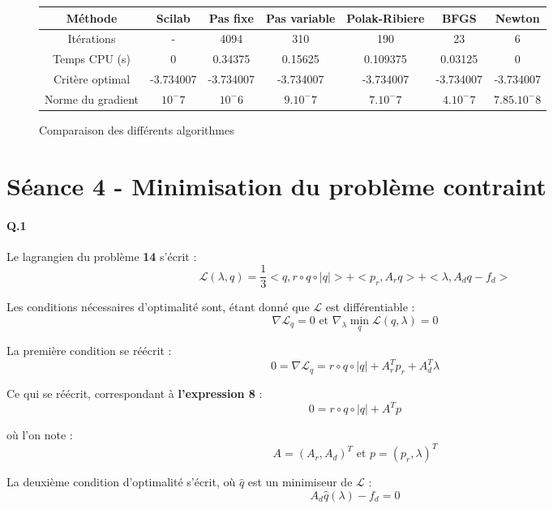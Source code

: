 \documentclass{article}
\begin{document}
    \begin{figure}

        \begin{tabular}{|c|cccccc|}
            \hline
            Méthode & Scilab & Pas fixe & Pas variable & Polak-Ribiere & BFGS & Newton \\
            \hline 
            Itérations & - & 4094 & 310 & 190 & 23 & 6\\
            Temps CPU (s) & 0 & 0.34375 & 0.15625 & 0.109375 & 0.03125 & 0\\
            Critère optimal & -3.734007 & -3.734007 & -3.734007 & -3.734007 & -3.734007 & -3.734007\\
            Norme du gradient & $10^-7$ & $10^-6$ & $9.10^-7$ & $7.10^-7$ & $4.10^-7$ & $7.85.10^-8$\\
            \hline
        \end{tabular}
        \caption{Comparaison des différents algorithmes}
        \label{comparAlgo}
    \end{figure}

    \section{Séance 4 - Minimisation du problème contraint}
        \paragraph{Q.1} Le lagrangien du problème \textbf{14} s'écrit : 
        \[ \mathcal{L}(\lambda, q) = \frac{1}{3}<q, r \circ q \circ |q|> + <p_r, A_rq>
                                    + <\lambda, A_dq - f_d> \]
        
        Les conditions nécessaires d'optimalité sont, étant donné que $\mathcal{L}$ est différentiable :
        \[ \nabla \mathcal{L}_q  = 0
            \text{ et } 
            \nabla_\lambda \min_q \mathcal{L}(q, \lambda) = 0 \]
        
        La première condition se réécrit : 
        \[ 0 = \nabla \mathcal{L}_q  = r \circ q \circ |q| + A_r^Tp_r + A_d^T\lambda \]

        Ce qui se réécrit, correspondant à \textbf{l'expression 8} :
        \[ 0 = r \circ q \circ |q| + A^Tp \]

        où l'on note :
        \[ A = (A_r, A_d)^T \text{ et } p = (p_r, \lambda)^T \]

        La deuxième condition d'optimalité s'écrit, où $\hat{q}$ est un minimiseur de $\mathcal{L}$ :
        \[ A_d \hat{q}(\lambda) - f_d = 0 \]
\end{document}
